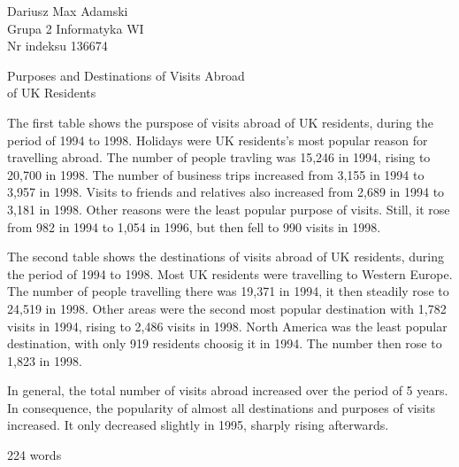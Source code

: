 \documentclass[12pt]{article}
\begin{document}

\begin{flushleft} 
	Dariusz Max Adamski \\
	Grupa 2 Informatyka WI\\
	Nr indeksu 136674
\end{flushleft}

\begin{center} 
	\vspace{0.8cm} \Large
	Purposes and Destinations of Visits Abroad \\ of UK Residents
	\vspace{0.5cm}
\end{center}

The first table shows the purspose of visits abroad of UK residents, during the period of 1994 to 1998. Holidays were UK residents's most popular reason for travelling abroad. The number of people travling was 15,246 in 1994, rising to 20,700 in 1998. The number of business trips increased from 3,155 in 1994 to 3,957 in 1998. Visits to friends and relatives also increased from 2,689 in 1994 to 3,181 in 1998. Other reasons were the least popular purpose of visits. Still, it rose from 982 in 1994 to 1,054 in 1996, but then fell to 990 visits in 1998.

The second table shows the destinations of visits abroad of UK residents, during the period of 1994 to 1998. Most UK residents were travelling to Western Europe. The number of people travelling there was 19,371 in 1994, it then steadily rose to 24,519 in 1998. Other areas were the second most popular destination with 1,782 visits in 1994, rising to 2,486 visits in 1998. North America was the least popular destination, with only 919 residents choosig it in 1994. The number then rose to 1,823 in 1998.

In general, the total number of visits abroad increased over the period of 5 years. In consequence, the popularity of almost all destinations and purposes of visits increased. It only decreased slightly in 1995, sharply rising afterwards.

224 words
\end{document}
